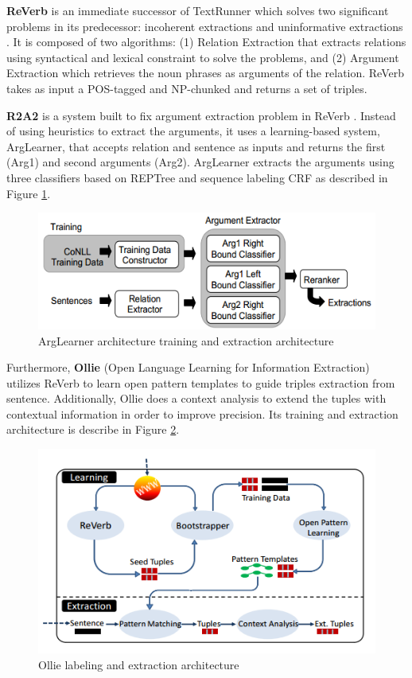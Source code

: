 \documentclass[peerreview,12pt]{IEEEtran}
\begin{document}
\textbf{ReVerb} is an immediate successor of TextRunner which solves two significant problems in its predecessor: incoherent extractions and uninformative extractions \cite{fader2011identifying}. It is composed of two algorithms: (1) Relation Extraction that extracts relations using syntactical and lexical constraint to solve the problems, and (2) Argument Extraction which retrieves the noun phrases as arguments of the relation. ReVerb takes as input a POS-tagged and NP-chunked and returns a set of triples.

\textbf{R2A2} is a system built to fix argument extraction problem in ReVerb \cite{etzioni2011open}. Instead of using heuristics to extract the arguments, it uses a learning-based system, ArgLearner, that accepts relation and sentence as inputs and returns the first (Arg1) and second arguments (Arg2). ArgLearner extracts the arguments using three classifiers based on REPTree and sequence labeling CRF as described in Figure \ref{fig_arglearner_architecture}.

\begin{figure}
\centering
\includegraphics[scale=0.5]{arglearner_architecture}
\caption{ArgLearner architecture training and extraction architecture}
\label{fig_arglearner_architecture}
\end{figure}

Furthermore, \textbf{Ollie} (Open Language Learning for Information Extraction)\cite{schmitz2012open} utilizes ReVerb\cite{fader2011identifying} to learn open pattern templates to guide triples extraction from sentence. Additionally, Ollie does a context analysis to extend the tuples with contextual information in order to improve precision\cite{schmitz2012open}. Its training and extraction architecture is describe in Figure \ref{fig_ollie_architecture}.

\begin{figure}
\centering
\includegraphics[scale=0.5]{ollie_architecture}
\caption{Ollie labeling and extraction architecture}
\label{fig_ollie_architecture}
\end{figure}
\end{document}
